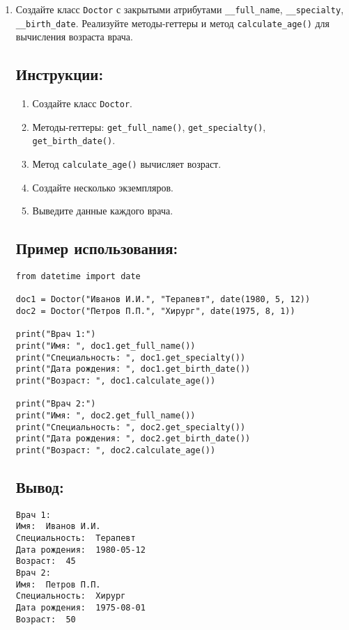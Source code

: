\begin{enumerate}
\item
Создайте класс \texttt{Doctor} с закрытыми атрибутами \texttt{\_\_full\_name}, \texttt{\_\_specialty}, \texttt{\_\_birth\_date}. Реализуйте методы-геттеры и метод \texttt{calculate\_age()} для вычисления возраста врача.

\subsection*{Инструкции:}
\begin{enumerate}
    \item Создайте класс \texttt{Doctor}.
    \item Методы-геттеры: \texttt{get\_full\_name()}, \texttt{get\_specialty()}, \texttt{get\_birth\_date()}.
    \item Метод \texttt{calculate\_age()} вычисляет возраст.
    \item Создайте несколько экземпляров.
    \item Выведите данные каждого врача.
\end{enumerate}

\subsection*{Пример использования:}
\begin{lstlisting}[caption=Пример кода]
from datetime import date

doc1 = Doctor("Иванов И.И.", "Терапевт", date(1980, 5, 12))
doc2 = Doctor("Петров П.П.", "Хирург", date(1975, 8, 1))

print("Врач 1:")
print("Имя: ", doc1.get_full_name())
print("Специальность: ", doc1.get_specialty())
print("Дата рождения: ", doc1.get_birth_date())
print("Возраст: ", doc1.calculate_age())

print("Врач 2:")
print("Имя: ", doc2.get_full_name())
print("Специальность: ", doc2.get_specialty())
print("Дата рождения: ", doc2.get_birth_date())
print("Возраст: ", doc2.calculate_age())
\end{lstlisting}

\subsection*{Вывод:}
\begin{lstlisting}[caption=Ожидаемый вывод]
Врач 1:
Имя:  Иванов И.И.
Специальность:  Терапевт
Дата рождения:  1980-05-12
Возраст:  45
Врач 2:
Имя:  Петров П.П.
Специальность:  Хирург
Дата рождения:  1975-08-01
Возраст:  50
\end{lstlisting}


\end{enumerate}
